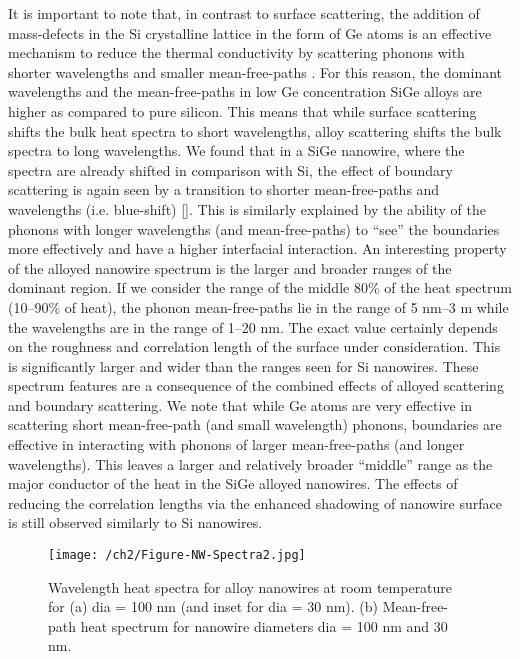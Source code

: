 It is important to note that, in contrast to surface scattering, the addition of mass-defects in the Si crystalline lattice in the form of Ge atoms is an effective mechanism to reduce the thermal conductivity by scattering phonons with shorter wavelengths and smaller mean-free-paths \cite{RN132,RN98}. For this reason, the dominant wavelengths and the mean-free-paths in low Ge concentration SiGe alloys are higher as compared to pure silicon. This means that while surface scattering shifts the bulk heat spectra to short wavelengths, alloy scattering shifts the bulk spectra to long wavelengths. We found that in a SiGe nanowire, where the spectra are already shifted in comparison with Si, the effect of boundary scattering is again seen by a transition to shorter mean-free-paths and wavelengths (i.e. blue-shift) []. This is similarly explained by the ability of the phonons with longer wavelengths (and mean-free-paths) to “see” the boundaries more effectively and have a higher interfacial interaction. An interesting property of the alloyed nanowire spectrum is the larger and broader ranges of the dominant region. If we consider the range of the middle 80\% of the heat spectrum (10–90\% of heat), the phonon mean-free-paths lie in the range of 5 nm–3 \si{\micro}m while the wavelengths are in the range of 1–20 nm. The exact value certainly depends on the roughness and correlation length of the surface under consideration. This is significantly larger and wider than the ranges seen for Si nanowires. These spectrum features are a consequence of the combined effects of alloyed scattering and boundary scattering. We note that while Ge atoms are very effective in scattering short mean-free-path (and small wavelength) phonons, boundaries are effective in interacting with phonons of larger mean-free-paths (and longer wavelengths). This leaves a larger and relatively broader “middle” range as the major conductor of the heat in the SiGe alloyed nanowires. The effects of reducing the correlation lengths via the enhanced shadowing of nanowire surface is still observed similarly to Si nanowires.
\begin{figure}[hbtp]
  \centering \texttt{[image: /ch2/Figure-NW-Spectra2.jpg]}
  \caption{Wavelength heat spectra for  alloy nanowires at room temperature for (a) \gls{dia} = 100 nm (and inset for \gls{dia} = 30 nm). (b) Mean-free-path heat spectrum for nanowire diameters \gls{dia} = 100 nm and 30 nm.}
  \label{fig:ch2-nw-spectra-2}
\end{figure}


